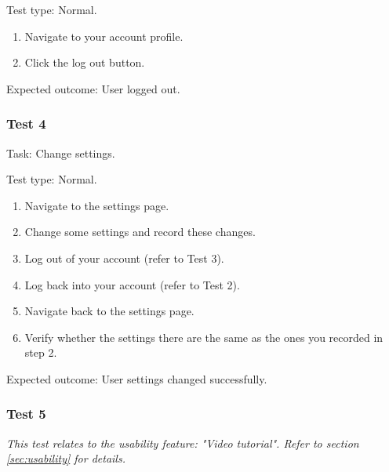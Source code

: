 {\color{gray} \hrulefill}

{\sffamily Test type: Normal.}\\

\begin{enumerate}
  \item Navigate to your account profile.
  \item Click the log out button.
\end{enumerate}

{\sffamily Expected outcome:} User logged out. \\

{\color{gray} \hrulefill}

\vspace{0.2cm}

\subsubsection{Test 4}

{\sffamily Task:} Change settings.\\

{\color{gray} \hrulefill}

{\sffamily Test type: Normal.}\\

\begin{enumerate}
  \item Navigate to the settings page.
  \item Change some settings and record these changes.
  \item Log out of your account (refer to Test 3).
  \item Log back into your account (refer to Test 2).
  \item Navigate back to the settings page.
  \item Verify whether the settings there are the same as the ones you recorded in step 2.
\end{enumerate}

{\sffamily Expected outcome:} User settings changed successfully. \\

{\color{gray} \hrulefill}

\vspace{0.2cm}

\subsubsection{Test 5}

\textit{This test relates to the usability feature:
"Video tutorial". Refer to section
\ref{sec:usability} for details.} \\ \vspace{0.2cm}

